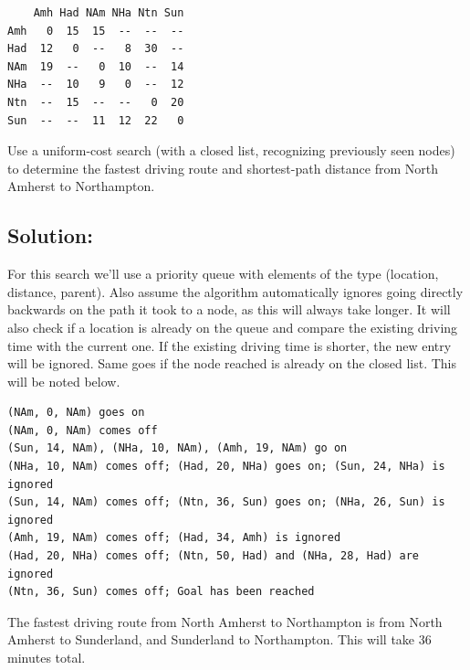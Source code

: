 \documentclass[12pt]{article}
\begin{document}
\begin{verbatim}
    Amh Had NAm NHa Ntn Sun
Amh   0  15  15  --  --  --
Had  12   0  --   8  30  --
NAm  19  --   0  10  --  14
NHa  --  10   9   0  --  12
Ntn  --  15  --  --   0  20
Sun  --  --  11  12  22   0

\end{verbatim}

Use a uniform-cost search (with a closed list, recognizing previously seen nodes) to determine the fastest driving route and shortest-path distance from North Amherst to Northampton.

\subsection*{\textbf{Solution:}}
For this search we'll use a priority queue with elements of the type (location, distance, parent). Also assume the algorithm automatically ignores going directly backwards on the path it took to a node, as this will always take longer. It will also check if a location is already on the queue and compare the existing driving time with the current one. If the existing driving time is shorter, the new entry will be ignored. Same goes if the node reached is already on the closed list. This will be noted below.

\begin{verbatim}
(NAm, 0, NAm) goes on
(NAm, 0, NAm) comes off
(Sun, 14, NAm), (NHa, 10, NAm), (Amh, 19, NAm) go on
(NHa, 10, NAm) comes off; (Had, 20, NHa) goes on; (Sun, 24, NHa) is ignored
(Sun, 14, NAm) comes off; (Ntn, 36, Sun) goes on; (NHa, 26, Sun) is ignored
(Amh, 19, NAm) comes off; (Had, 34, Amh) is ignored
(Had, 20, NHa) comes off; (Ntn, 50, Had) and (NHa, 28, Had) are ignored
(Ntn, 36, Sun) comes off; Goal has been reached
\end{verbatim}

The fastest driving route from North Amherst to Northampton is from North Amherst to Sunderland, and Sunderland to Northampton. This will take 36 minutes total.

\newpage
\end{document}

